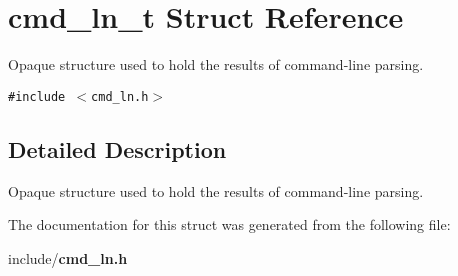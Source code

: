 \section{cmd\_\-ln\_\-t Struct Reference}
\label{structcmd__ln__t}
Opaque structure used to hold the results of command-line parsing.  


{\tt \#include $<$cmd\_\-ln.h$>$}



\subsection{Detailed Description}
Opaque structure used to hold the results of command-line parsing. 

The documentation for this struct was generated from the following file:\begin{CompactItemize}
\item 
include/{\bf cmd\_\-ln.h}\end{CompactItemize}
